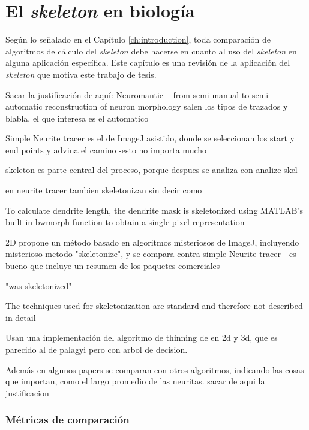 \chapter{El \textit{skeleton} en biología}
\label{ch:metrics}

Según lo señalado en el Capítulo \ref{ch:introduction}, toda comparación de algoritmos de cálculo del \textit{skeleton} debe hacerse en cuanto al uso del \textit{skeleton} en alguna aplicación específica. Este capítulo es una revisión de la aplicación del \textit{skeleton} que motiva este trabajo de tesis.



Sacar la justificación de aquí:
Neuromantic – from semi-manual to semi-automatic reconstruction of neuron morphology
salen los tipos de trazados y blabla, el que interesa es el automatico

Simple Neurite tracer \cite{longair2011simple} es el de ImageJ asistido, donde se seleccionan los start y end points y advina el camino -esto no importa mucho

skeleton es parte central del proceso, porque despues se analiza con analize skel


en neurite tracer tambien skeletonizan sin decir como



\cite{schmitz2011automated} To calculate dendrite length, the dendrite mask is skeletonized
using MATLAB’s built in bwmorph function to obtain a single-pixel
representation


\cite{ho2011neurphologyj} 2D propone un método basado en algoritmos misteriosos de ImageJ, incluyendo misterioso metodo "skeletonize", y se compara contra simple Neurite tracer - es bueno que incluye un resumen de los paquetes comerciales

\cite{pani2014morphoneuronet} "was skeletonized"

\cite{billeci2013neuronmorphological} The techniques used for skeletonization are standard and therefore not described in detail



Usan una implementación del algoritmo de thinning de \cite{lee1994building} en 2d y 3d, que es parecido al de palagyi pero con arbol de decision.

Además en algunos papers se comparan con otros algoritmos, indicando las cosas que importan, como el largo promedio de las neuritas. sacar de aqui la justificacion

\subsection{Métricas de comparación}

